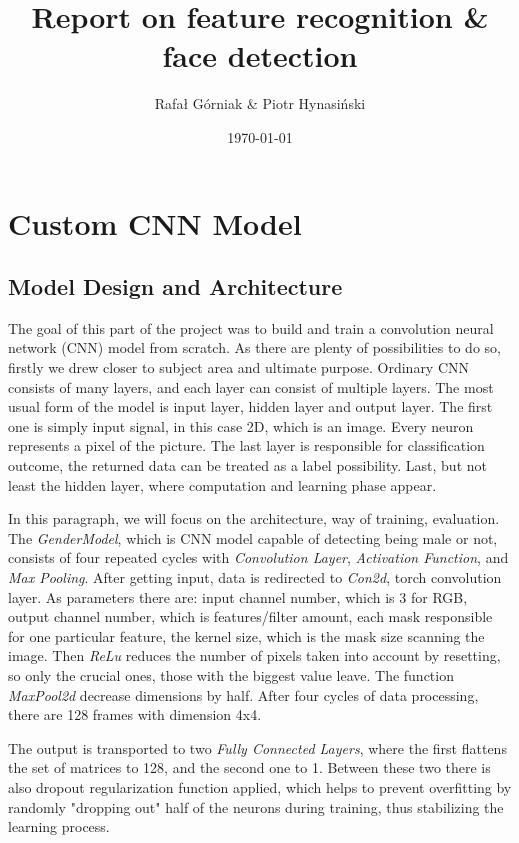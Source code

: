 \documentclass{article}
\title{Report on feature recognition {\&} face detection}
\author{Rafał Górniak \& Piotr Hynasiński}
\date{\today}
\begin{document}
\maketitle

\section{Custom CNN Model}
\subsection{Model Design and Architecture}
    The goal of this part of the project was to build and train a convolution neural network (CNN) model from scratch.
    As there are plenty of possibilities to do so, firstly we drew closer to subject area and ultimate purpose. Ordinary CNN consists of many layers, and each layer can consist of multiple layers. The most usual form of the model is input layer, hidden layer and output layer. The first one is simply input signal, in this case 2D, which is an image. Every neuron represents a pixel of the picture. The last layer is responsible for classification outcome, the returned data can be treated as a label possibility. Last, but not least the hidden layer, where computation and learning phase appear.

\vspace{0.2cm}
    In this paragraph, we will focus on the architecture, way of training, evaluation. The {\textit{GenderModel}}, which is CNN model capable of detecting being male or not, consists of four repeated cycles with {\textit{Convolution Layer}}, {\textit{Activation Function}}, and {\textit{Max Pooling}}. After getting input, data is redirected to {\textit{Con2d}}, torch convolution layer. As parameters there are: input channel number, which is 3 for RGB, output channel number, which is features/filter amount, each mask responsible for one particular feature, the kernel size, which is the mask size scanning the image. Then {\textit{ReLu}} reduces the number of pixels taken into account by resetting, so only the crucial ones, those with the biggest value leave. The function {\textit{MaxPool2d}} decrease dimensions by half. After four cycles of data processing, there are 128 frames with dimension 4x4.

    The output is transported to two {\textit{Fully Connected Layers}}, where the first flattens the set of matrices to 128, and the second one to 1. Between these two there is also dropout regularization function applied, which helps to prevent overfitting by randomly "dropping out" half of the neurons during training, thus stabilizing the learning process.
\end{document}
